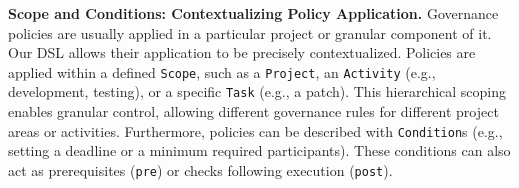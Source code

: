 \smallskip
\noindent\textbf{Scope and Conditions: Contextualizing Policy Application.}
Governance policies are usually applied in a particular project or granular component of it. Our DSL allows their application to be precisely contextualized.
Policies are applied within a defined \texttt{Scope}, such as a \texttt{Project}, an \texttt{Activity} (e.g., development, testing), or a specific \texttt{Task} (e.g., a patch). 
This hierarchical scoping enables granular control, allowing different governance rules for different project areas or activities.
Furthermore, policies can be described with \texttt{Condition}s (e.g., setting a deadline or a minimum required participants). %
These conditions can also act as prerequisites (\texttt{pre}) or checks following execution (\texttt{post}). 





